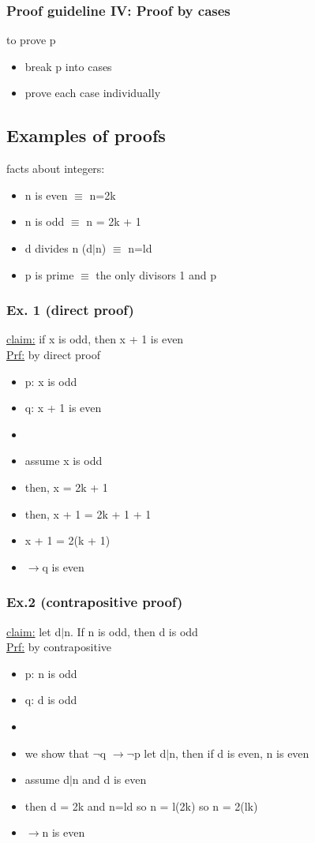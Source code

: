 \documentclass[a4paper]{article}
\newcommand{\ra}{$\rightarrow$}
\newcommand{\n}{$\neg$}
\begin{document}
\begin{itemize}
      \subsubsection{Proof guideline IV: Proof by cases}
        to prove p
        \begin{itemize}
          \item break p into cases
          \item prove each case individually
        \end{itemize}
    \subsection{Examples of proofs}
      facts about integers:
      \begin{itemize}
        \item n is even $\equiv$ n=2k
        \item n is odd $\equiv$ n = 2k + 1
        \item d divides n (d$|$n) $\equiv$ n=ld
        \item p is prime $\equiv$ the only divisors 1 and p
      \end{itemize}
      \subsubsection{Ex. 1 (direct proof)}
        \underline{claim:} if x is odd, then x + 1 is even\\
        \underline{Prf:} by direct proof
        \begin{itemize}
          \item p: x is odd
          \item q: x + 1 is even
          \item[]
          \item assume x is odd
          \item then, x = 2k + 1
          \item then, x + 1 = 2k + 1 + 1
          \item x + 1 = 2(k + 1)
          \item \ra q is even
        \end{itemize}
      \subsubsection{Ex.2 (contrapositive proof)}
        \underline{claim:} let d$|$n. If n is odd, then d is odd\\
        \underline{Prf:} by contrapositive
        \begin{itemize}
          \item p: n is odd
          \item q: d is odd
          \item[]
          \item we show that \n q \ra \n p
            \subitem let d$|$n, then if d is even, n is even
          \item assume d$|$n and d is even
          \item then d = 2k and n=ld so n = l(2k) so n = 2(lk)
          \item \ra n is even
        \end{itemize}

\end{itemize}
\end{document}
